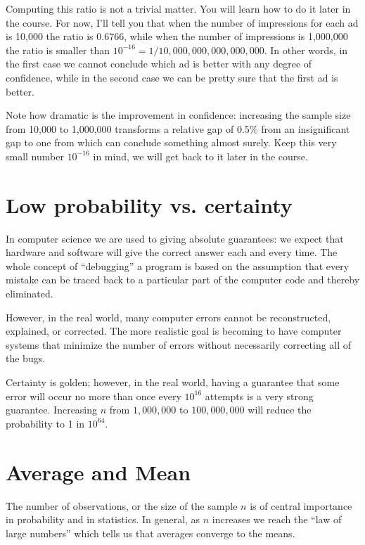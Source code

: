 Computing this ratio is not a trivial matter. You will learn how to
do it later in the course. For now, I'll tell you that when the number
of impressions for each ad is 10,000 the ratio is $0.6766$, while when
the number of impressions is 1,000,000 the ratio is smaller than
$10^{-16} = 1/10,000,000,000,000,000$. In other words, in the first
case we cannot conclude which ad is better with any degree of
confidence, while in the second case we can be pretty sure that the
first ad is better.

Note how dramatic is the improvement in confidence: increasing the
sample size from 10,000 to 1,000,000 transforms a relative gap of 0.5\%
from an insignificant gap to one from which can conclude something
almost surely. Keep this very small number $10^{-16}$ in mind, we will
get back to it later in the course.

\section{Low probability vs. certainty}
In computer science we are used to giving absolute guarantees: we
expect that hardware and software will give the correct answer each 
and every time. The whole concept of ``debugging'' a program is based
on the assumption that every mistake can be traced back to a
particular part of the computer code and thereby eliminated. 

However, in the real world, many computer errors cannot be
reconstructed, explained, or corrected. The more realistic goal is
becoming to have computer systems that minimize the number of errors
without necessarily correcting all of the bugs.

Certainty is golden; however, in the real world, having a guarantee
that some error will occur no more than once every $10^{16}$ attempts
is a very strong guarantee. Increasing $n$ from $1,000,000$ to
$100,000,000$ will reduce the probability to 1 in $10^{64}$.

\section{Average and Mean}
The number of observations, or the size of the sample $n$ is of
central importance in probability and in statistics. In general, as
$n$ increases we reach the ``law of large numbers'' which tells us
that averages converge to the means.

